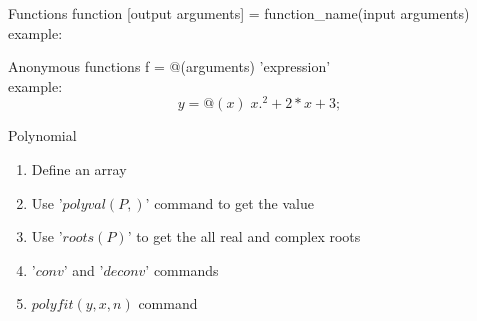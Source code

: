 \documentclass{beamer}
\begin{document}
		\begin{frame}{Functions}
			\large function [output arguments] = function\_name(input arguments)
			example:\\
			
		\end{frame}
		
		\begin{frame}{Anonymous functions}
			\large f = @(arguments) 'expression'\\
			\vspace{1cm}
			example:\\
			$$y = @(x)\; x.^2+2*x+3;$$
		\end{frame}
		
		\begin{frame}{Polynomial}
				\begin{enumerate}
					\item Define an array
					\item Use '$polyval(P,)$' command to get the value
					\item Use '$roots(P)$' to get the all real and complex roots
					\item '$conv $' and '$ deconv$' commands
					\item $polyfit(y,x,n)$ command
				\end{enumerate}
		\end{frame}
\end{document}

